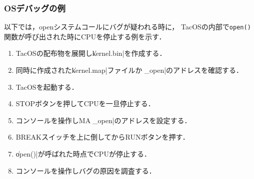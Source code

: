 \subsubsection{OSデバッグの例}
以下では，openシステムコールにバグが疑われる時に，
TacOSの内部で\texttt{open()}関数が呼び出された時にCPUを停止する例を示す．

\begin{enumerate}
\item TacOSの配布物を展開し\|kernel.bin|を作成する．
\item 同時に作成された\|kernel.map|ファイルから\|_open|のアドレスを確認する．
\item TacOSを起動する．
\item STOPボタンを押してCPUを一旦停止する．
\item コンソールを操作しMAに\|_open|のアドレスを設定する．
\item BREAKスイッチを上に倒してからRUNボタンを押す．
\item \|open()|が呼ばれた時点でCPUが停止する．
\item コンソールを操作しバグの原因を調査する．
\end{enumerate}
